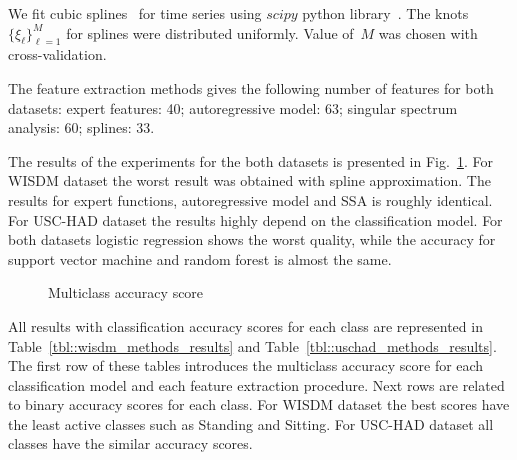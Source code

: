 \documentclass{llncs}
\begin{document}
We fit cubic splines~\cite{deboor1978splines} for time series using $scipy$ python library~\cite{scipy}. 
The knots $\{\xi_{\ell}\}_{\ell = 1}^M$ for splines were distributed uniformly. 
Value of~$M$ was chosen with cross-validation. 

The feature extraction methods gives the following number of features for both datasets: expert features: 40; autoregressive model: 63; singular spectrum analysis: 60; splines: 33.

The results of the experiments for the both datasets is presented in Fig.~\ref{fig::accuracy_results}. For WISDM dataset the worst result was obtained with spline approximation. 
The results for expert functions, autoregressive model and SSA is roughly identical. For USC-HAD dataset the results highly depend on the classification model. 
For both datasets logistic regression shows the worst quality, while the accuracy for support vector machine and random forest is almost the same.

\begin{figure}[!h]
	\centering
	\caption{Multiclass accuracy score}
	\label{fig::accuracy_results}
\end{figure}

All results with classification accuracy scores for each class are represented in Table~\ref{tbl::wisdm_methods_results} and Table~\ref{tbl::uschad_methods_results}. The first row of these tables introduces the multiclass accuracy score for each classification model and each feature extraction procedure. Next rows are related to binary accuracy scores for each class. For WISDM dataset the best scores have the least active classes such as Standing and Sitting. For USC-HAD dataset all classes have the similar accuracy scores.
\end{document}
